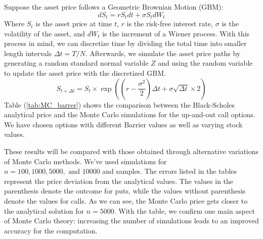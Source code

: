 Suppose the asset price follows a Geometric Brownian Motion (GBM):
\begin{equation}\label{eq:GBM}
	dS_t=rS_tdt+\sigma S_tdW_t
\end{equation}
Where $S_t$ is the asset price at time $t$, $r$ is the risk-free interest rate, $\sigma$ is the volatility of the asset, and $dW_t$ is the increment of a Wiener process. With this process in mind, we can discretize time by dividing the total time into smaller length intervals $\Delta t=T/N.$ Afterwards, we simulate the asset price paths by generating a random standard normal variable $Z$ and using the random variable to update the asset price with the discretized GBM.
\begin{equation}
	S_{t+\Delta t}=S_t\times\exp\left(\left(r-\frac{\sigma^2}{2}\right)\Delta t+\sigma\sqrt{\Delta t}\times 2\right)
\end{equation}
Table (\ref{tab:MC_barrer}) shows the comparison between the Black-Scholes analytical price and the Monte Carlo simulations for the up-and-out call options. We have chosen options with different Barrier values as well as varying stock values.


These results will be compared with those obtained through alternative variations of Monte Carlo methods. We've used simulations for $n=100,1000,5000,\text{ and }10000$ and samples. The errors listed in the tables represent the price deviation from the analytical values. The values in the parenthesis denote the outcome for puts, while the values without parenthesis denote the values for calls. As we can see, the Monte Carlo price gets closer to the analytical solution for $n=5000$. With the table, we confirm one main aspect of Monte Carlo theory: increasing the number of simulations leads to an improved accuracy for the computation.
